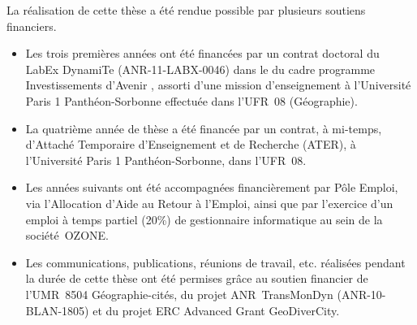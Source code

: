 \vspace*{\fill}
{\small
La réalisation de cette thèse a été rendue possible par plusieurs soutiens financiers.
\begin{itemize}[noitemsep,leftmargin=*]
	\item Les trois premières années ont été financées par un contrat doctoral du LabEx DynamiTe (ANR-11-LABX-0046) dans le du cadre programme \og Investissements d'Avenir \fg{}, assorti d'une mission d'enseignement à l'Université Paris 1 Panthéon-Sorbonne effectuée dans l'UFR~08 (Géographie).
	\item La quatrième année de thèse a été financée par un contrat, à mi-temps, d'Attaché Temporaire d'Enseignement et de Recherche (ATER), à l'Université Paris 1 Panthéon-Sorbonne, dans l'UFR~08.
	\item Les années suivants ont été accompagnées financièrement par Pôle Emploi, via l'Allocation d'Aide au Retour à l'Emploi, ainsi que par l'exercice d'un emploi à temps partiel (20\%) de gestionnaire informatique au sein de la société~OZONE.
	\item Les communications, publications, réunions de travail, etc. réalisées pendant la durée de cette thèse ont été permises grâce au soutien financier de l'UMR~8504 Géographie-cités, du projet ANR~TransMonDyn (ANR-10-BLAN-1805) et du projet ERC Advanced Grant GeoDiverCity.
\end{itemize}
}